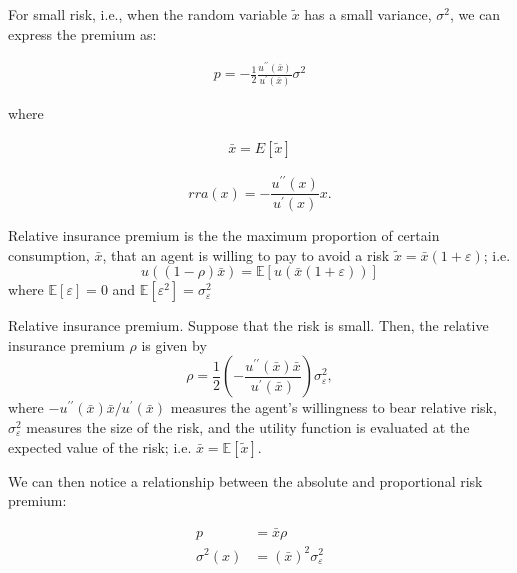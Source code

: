 \documentclass[10pt]{article}
\begin{document}
For small risk, i.e., 
when the random variable $\tilde{x}$ has a small variance, 
$\sigma^2$, we can express the premium as:

\begin{align}
    p=-\frac{1}{2} \frac{u^{\prime \prime}(\bar{x})}{u^{\prime}(\bar{x})} \sigma^2
\end{align}

where 

\begin{align}
    \bar{x}=E[\tilde{x}]
\end{align}

\begin{definition}
    
        $$
        r r a(x)=-\frac{u^{\prime \prime}(x)}{u^{\prime}(x)} x .
        $$
     
\end{definition}

\begin{definition}
    Relative insurance premium is the the maximum proportion of certain consumption, $\bar{x}$, that an agent is willing to pay to avoid a risk $\tilde{x}=\bar{x}(1+\varepsilon)$; i.e.
    $$
    u((1-\rho) \bar{x})=\mathbb{E}[u(\bar{x}(1+\varepsilon))]
    $$
    where $\mathbb{E}[\varepsilon]=0$ and $\mathbb{E}\left[\varepsilon^2\right]=\sigma_{\varepsilon}^2$

\end{definition}

\begin{proposition}
    Relative insurance premium. Suppose that the risk is small. Then, the relative insurance premium $\rho$ is given by
    $$
    \rho=\frac{1}{2}\left(-\frac{u^{\prime \prime}(\bar{x}) \bar{x}}{u^{\prime}(\bar{x})}\right) \sigma_{\varepsilon}^2,
    $$
    where $-u^{\prime \prime}(\bar{x}) \bar{x} / u^{\prime}(\bar{x})$ measures the agent's willingness to bear relative risk, $\sigma_{\varepsilon}^2$ measures the size of the risk, and the utility function is evaluated at the expected value of the risk; i.e. $\bar{x}=\mathbb{E}[\tilde{x}]$.

\end{proposition}

We can then notice a relationship between the 
absolute and proportional risk premium:

\begin{align}
    p & =\bar{x} \rho \\
    \sigma^2(x) & =(\bar{x})^2 \sigma_{\varepsilon}^2
\end{align}
\end{document}

